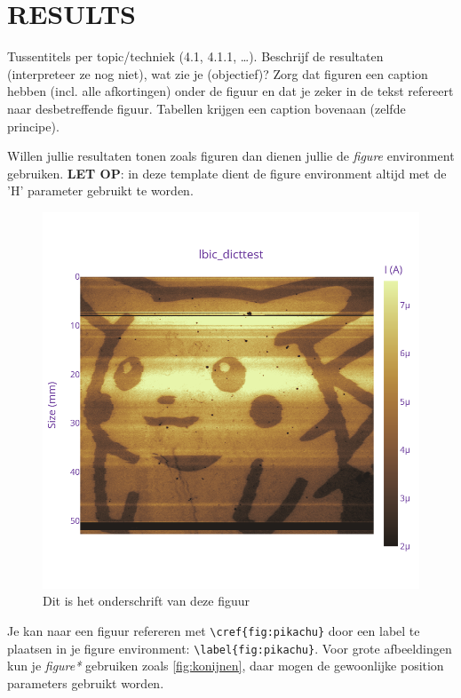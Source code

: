 \section{RESULTS}
Tussentitels per topic/techniek (4.1, 4.1.1, \dots).
Beschrijf de resultaten (interpreteer ze nog niet), wat zie je (objectief)?
Zorg dat figuren een caption hebben (incl. alle afkortingen) onder de figuur en dat je zeker in de tekst refereert naar desbetreffende figuur. 
Tabellen krijgen een caption bovenaan (zelfde principe).

Willen jullie resultaten tonen zoals figuren dan dienen jullie de \textit{figure} environment gebruiken.
\textbf{LET OP}: in deze template dient de figure environment altijd met de 'H' parameter gebruikt te worden.
\begin{figure}[H]
    \centering
    \includegraphics[width=\linewidth]{Figures/newplot(4).png}
    \caption{Dit is het onderschrift van deze figuur}
    \label{fig:pikachu}
\end{figure}

Je kan naar een figuur refereren met \lstinline!\cref{fig:pikachu}! door een label te plaatsen in je figure environment: \lstinline!\label{fig:pikachu}!.
Voor grote afbeeldingen kun je \textit{figure*} gebruiken zoals \cref{fig:konijnen}, daar mogen de gewoonlijke position parameters gebruikt worden.

